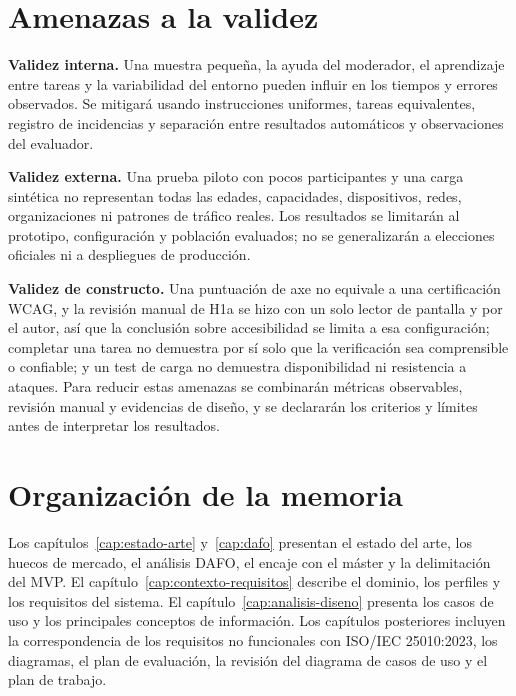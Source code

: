 \section{Amenazas a la validez}
\label{sec:amenazas-validez}

\textbf{Validez interna.} Una muestra pequeña, la ayuda del moderador, el
aprendizaje entre tareas y la variabilidad del entorno pueden influir en los
tiempos y errores observados. Se mitigará usando instrucciones uniformes,
tareas equivalentes, registro de incidencias y separación entre resultados
automáticos y observaciones del evaluador.

\textbf{Validez externa.} Una prueba piloto con pocos participantes y una
carga sintética no representan todas las edades, capacidades, dispositivos,
redes, organizaciones ni patrones de tráfico reales. Los resultados se
limitarán al prototipo, configuración y población evaluados; no se
generalizarán a elecciones oficiales ni a despliegues de producción.

\textbf{Validez de constructo.} Una puntuación de axe no equivale a una
certificación WCAG, y la revisión manual de H1a se hizo con un solo lector de
pantalla y por el autor, así que la conclusión sobre accesibilidad se limita a
esa configuración;
completar una tarea no demuestra por sí solo que la
verificación sea comprensible o confiable; y un test de carga no demuestra
disponibilidad ni resistencia a ataques. Para reducir estas amenazas se
combinarán métricas observables, revisión manual y evidencias de diseño, y se
declararán los criterios y límites antes de interpretar los resultados.

\section{Organización de la memoria}
\label{sec:organizacion}

Los capítulos~\ref{cap:estado-arte} y~\ref{cap:dafo} presentan el estado del
arte, los huecos de mercado, el análisis DAFO, el encaje con el máster y la
delimitación del MVP. El capítulo~\ref{cap:contexto-requisitos} describe el dominio, los perfiles y
los requisitos del sistema. El capítulo~\ref{cap:analisis-diseno} presenta
los casos de uso y los principales conceptos de información. Los capítulos
posteriores incluyen la correspondencia de los requisitos no funcionales con
ISO/IEC 25010:2023, los diagramas, el plan de evaluación, la revisión del
diagrama de casos de uso y el plan de trabajo.




